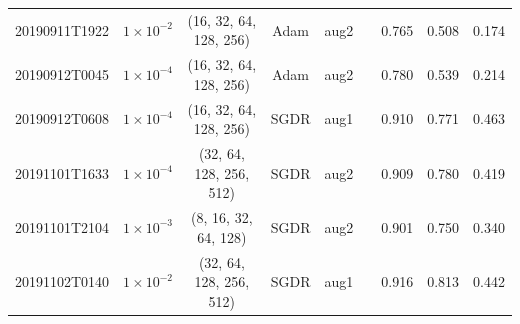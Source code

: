 \begin{table}[!ht]
\begin{adjustbox}{width=\columnwidth, center}
\begin{tabular}{ccccccccc}
			20190911T1922                        & $1\times10^{-2}$                                   & (16, 32, 64, 128, 256)                      & Adam                                & aug2                                                                                      & \xmark                                                                                     & 0.765          & 0.508          & 0.174          \\
			20190912T0045                        & $1\times10^{-4}$                                 & (16, 32, 64, 128, 256)                      & Adam                                & aug2                                                                                      & \xmark                                                                                     & 0.780          & 0.539          & 0.214          \\
			20190912T0608                        & $1\times10^{-4}$                                 & (16, 32, 64, 128, 256)                      & SGDR                                & aug1                                                                                      & \cmark                                                                                     & 0.910          & 0.771          & 0.463          \\
			20191101T1633                        & $1\times10^{-4}$                                 & (32, 64, 128, 256, 512)                     & SGDR                                & aug2                                                                                      & \cmark                                                                                     & 0.909          & 0.780          & 0.419          \\
			20191101T2104                        & $1\times10^{-3}$                                  & (8, 16, 32, 64, 128)                        & SGDR                                & aug2                                                                                      & \cmark                                                                                     & 0.901          & 0.750          & 0.340          \\
			20191102T0140                        & $1\times10^{-2}$                                   & (32, 64, 128, 256, 512)                     & SGDR                                & aug1                                                                                      & \cmark                                                                                     & 0.916          & 0.813          & 0.442          \\

\end{tabular}
\end{adjustbox}
\end{table}
